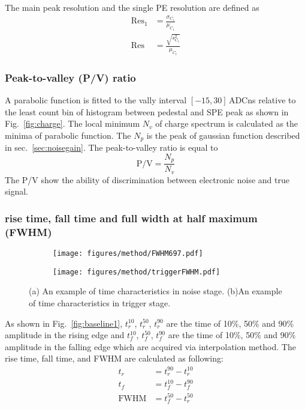 The main peak resolution and the single PE resolution are defined as
\begin{align}
    \mathrm{Res}_1&=\frac{\sigma_{C_1}}{\mu_{C_1}}\\
    \mathrm{Res}&=\frac{\sqrt{s^2_{C_t}}}{\mu_{C_t}}
\end{align}

\subsubsection{Peak-to-valley (P/V) ratio}
A parabolic function is fitted to the vally interval $[-15, 30]$\,ADCns relative to the least count bin of histogram between pedestal and SPE peak as shown in Fig.~\ref{fig:charge}. The local minimum $N_v$ of charge spectrum is calculated as the minima of parabolic function. The $N_p$ is the peak of gaussian function described in sec.~\ref{sec:noisegain}. The peak-to-valley ratio is equal to  
\begin{equation}
    \mathrm{P/V}=\frac{N_p}{N_v}
\end{equation}
The P/V show the ability of discrimination between electronic noise and true signal.
\subsubsection{rise time, fall time and full width at half maximum (FWHM)}
\begin{figure}[!htbp]
    \centering
    \begin{subfigure}[t]{0.49\textwidth}
        \texttt{[image: figures/method/FWHM697.pdf]}
        \caption{}
        \label{fig:risefallFWHM}
    \end{subfigure}
    \begin{subfigure}[t]{0.49\textwidth}
        \texttt{[image: figures/method/triggerFWHM.pdf]}
        \caption{}
        \label{fig:triggerFWHM}
    \end{subfigure}
    \caption{(a) An example of time characteristics in noise stage. (b)An example of time characteristics in trigger stage.}
\end{figure}
As shown in Fig.~\ref{fig:baseline1}, $t^{10}_r$, $t^{50}_r$, $t^{90}_r$ are the time of 10\%, 50\% and 90\% amplitude in the rising edge and $t^{10}_f$, $t^{50}_f$, $t^{90}_f$ are the time of 10\%, 50\% and 90\% amplitude in the falling edge which are acquired via interpolation method. The rise time, fall time, and FWHM are calculated as following:
\begin{align}
    t_r &= t^{90}_r - t^{10}_r\\
    t_f &= t^{10}_f - t^{90}_f\\
    \mathrm{FWHM} &= t^{50}_f - t^{50}_r
\end{align}

